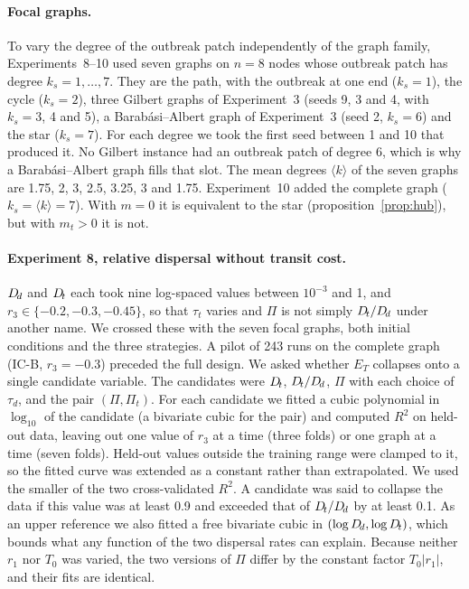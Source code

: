 \paragraph{Focal graphs.} To vary the degree of the outbreak patch independently of the graph family, Experiments~8--10 used seven graphs on $n = 8$ nodes whose outbreak patch has degree $k_s = 1,\dots,7$. They are the path, with the outbreak at one end ($k_s=1$), the cycle ($k_s=2$), three Gilbert graphs of Experiment~3 (seeds 9, 3 and 4, with $k_s = 3$, 4 and 5), a Barab\'asi--Albert graph of Experiment~3 (seed 2, $k_s = 6$) and the star ($k_s = 7$). For each degree we took the first seed between 1 and 10 that produced it. No Gilbert instance had an outbreak patch of degree 6, which is why a Barab\'asi--Albert graph fills that slot. The mean degrees $\langle k\rangle$ of the seven graphs are 1.75, 2, 3, 2.5, 3.25, 3 and 1.75. Experiment~10 added the complete graph ($k_s = \langle k\rangle = 7$). With $m = 0$ it is equivalent to the star (proposition~\ref{prop:hub}), but with $m_t > 0$ it is not.

\paragraph{Experiment 8, relative dispersal without transit cost.} $D_{\!d}$ and $D_{\!t}$ each took nine log-spaced values between $10^{-3}$ and 1, and $r_3 \in \{-0.2, -0.3, -0.45\}$, so that $\tau_t$ varies and $\Pi$ is not simply $D_{\!t}/D_{\!d}$ under another name. We crossed these with the seven focal graphs, both initial conditions and the three strategies. A pilot of 243 runs on the complete graph (IC-B, $r_3=-0.3$) preceded the full design. We asked whether $E_T$ collapses onto a single candidate variable. The candidates were $D_{\!t}$, $D_{\!t}/D_{\!d}$, $\Pi$ with each choice of $\tau_d$, and the pair $(\Pi, \Pi_t)$. For each candidate we fitted a cubic polynomial in $\log_{10}$ of the candidate (a bivariate cubic for the pair) and computed $R^2$ on held-out data, leaving out one value of $r_3$ at a time (three folds) or one graph at a time (seven folds). Held-out values outside the training range were clamped to it, so the fitted curve was extended as a constant rather than extrapolated. We used the smaller of the two cross-validated $R^2$. A candidate was said to collapse the data if this value was at least 0.9 and exceeded that of $D_{\!t}/D_{\!d}$ by at least 0.1. As an upper reference we also fitted a free bivariate cubic in $(\log D_{\!d}, \log D_{\!t})$, which bounds what any function of the two dispersal rates can explain. Because neither $r_1$ nor $T_0$ was varied, the two versions of $\Pi$ differ by the constant factor $T_0|r_1|$, and their fits are identical.

